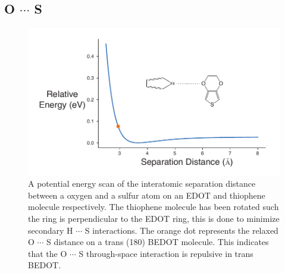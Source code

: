 \subsection{\texorpdfstring{O $\cdots$ S}{OS}}
\begin{figure}[hbt!]
    \centering
    \includegraphics{figures/append_aroma/ts_t_edot_copy.pdf}
    \caption{A potential energy scan of the interatomic separation distance between a oxygen and a sulfur atom on an EDOT and thiophene molecule respectively. The thiophene molecule has been rotated such the ring is perpendicular to the EDOT ring, this is done to minimize secondary H $\cdots$ S interactions. The orange dot represents the relaxed O $\cdots$ S distance on a trans (180\textdegree) BEDOT molecule. This indicates that the O $\cdots$ S through-space interaction is repulsive in trans BEDOT.}
    \label{fig:ts_t_edot}
\end{figure}
\clearpage

